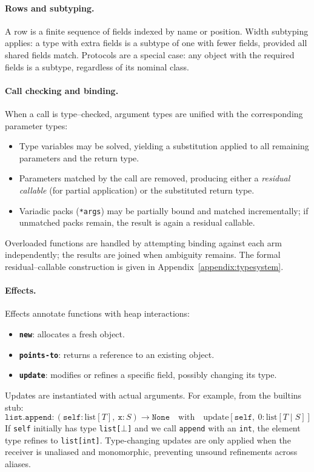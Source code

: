 \paragraph{Rows and subtyping.}
A row is a finite sequence of fields indexed by name or position.  
Width subtyping applies: a type with extra fields is a subtype of one with fewer fields, provided all shared fields match.  
Protocols are a special case: any object with the required fields is a subtype, regardless of its nominal class.

\paragraph{Call checking and binding.}
When a call is type--checked, argument types are unified with the corresponding parameter types:
\begin{itemize}
  \item Type variables may be solved, yielding a substitution applied to all remaining parameters and the return type.
  \item Parameters matched by the call are removed, producing either a \emph{residual callable} (for partial application) or the substituted return type.
  \item Variadic packs (\texttt{*args}) may be partially bound and matched incrementally; if unmatched packs remain, the result is again a residual callable.
\end{itemize}
Overloaded functions are handled by attempting binding against each arm independently; the results are joined when ambiguity remains.  
The formal residual--callable construction is given in Appendix~\ref{appendix:typesystem}.

\paragraph{Effects.}
Effects annotate functions with heap interactions:
\begin{itemize}
  \item \textbf{\texttt{new}}: allocates a fresh object.
  \item \textbf{\texttt{points-to}}: returns a reference to an existing object.
  \item \textbf{\texttt{update}}: modifies or refines a specific field, possibly changing its type.
\end{itemize}
Updates are instantiated with actual arguments. For example, from the builtins stub:
\[
\texttt{list.append} :
(\texttt{self}:\mathrm{list}[T],\ \texttt{x}:S) \to \texttt{None}
\quad\mathrm{with}\quad
\mathrm{update}[\texttt{self},\ 0:\mathrm{list}[T \mid S]]
\]
If \texttt{self} initially has type \texttt{list[$\bot$]} and we call \texttt{append} with an \texttt{int}, the element type refines to \texttt{list[int]}.  
Type-changing updates are only applied when the receiver is unaliased and monomorphic, preventing unsound refinements across aliases.


